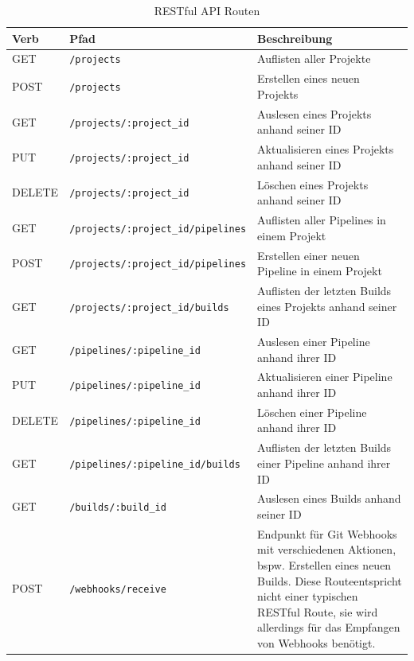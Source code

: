 \begin{table}[H]
  \footnotesize
  \begin{tabularx}{\textwidth}{| l | l | X |}
    \hline
    \textbf{Verb} & \textbf{Pfad} & \textbf{Beschreibung} \\ \hline
    GET & {\scriptsize \texttt{/projects}} & Auflisten aller Projekte \\ \hline
    POST & {\scriptsize \texttt{/projects}} & Erstellen eines neuen Projekts \\ \hline
    GET & {\scriptsize \texttt{/projects/:project\_id}} & Auslesen eines Projekts anhand seiner ID \\ \hline
    PUT & {\scriptsize \texttt{/projects/:project\_id}} & Aktualisieren eines Projekts anhand seiner ID \\ \hline
    DELETE & {\scriptsize \texttt{/projects/:project\_id}} & Löschen eines Projekts anhand seiner ID \\ \hline
    GET & {\scriptsize \texttt{/projects/:project\_id/pipelines}} & Auflisten aller Pipelines in einem Projekt \\ \hline
    POST & {\scriptsize \texttt{/projects/:project\_id/pipelines}} & Erstellen einer neuen Pipeline in einem Projekt \\ \hline
    GET & {\scriptsize \texttt{/projects/:project\_id/builds}} & Auflisten der letzten Builds eines Projekts anhand seiner ID \\ \hline
    GET & {\scriptsize \texttt{/pipelines/:pipeline\_id}} & Auslesen einer Pipeline anhand ihrer ID \\ \hline
    PUT & {\scriptsize \texttt{/pipelines/:pipeline\_id}} & Aktualisieren einer Pipeline anhand ihrer ID \\ \hline
    DELETE & {\scriptsize \texttt{/pipelines/:pipeline\_id}} & Löschen einer Pipeline anhand ihrer ID \\ \hline
    GET & {\scriptsize \texttt{/pipelines/:pipeline\_id/builds}} & Auflisten der letzten Builds einer Pipeline anhand ihrer ID \\ \hline
    GET & {\scriptsize \texttt{/builds/:build\_id}} & Auslesen eines Builds anhand seiner ID \\
    \hline\hline
    POST & {\scriptsize \texttt{/webhooks/receive}} & Endpunkt für Git Webhooks mit verschiedenen Aktionen, bspw. Erstellen eines neuen Builds. Diese Routeentspricht nicht einer typischen RESTful Route, sie wird allerdings für das Empfangen von Webhooks benötigt. \\
    \hline
  \end{tabularx}
  \caption{RESTful API Routen}
  \label{tab:rest-routes}
\end{table}

